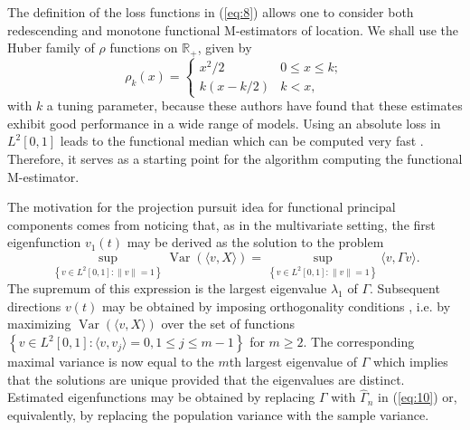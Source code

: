 \documentclass[11pt]{article}
\DeclareMathOperator{\Var}{Var}
\begin{document}
The definition of the loss functions in (\ref{eq:8}) allows one to consider both redescending and monotone functional M-estimators of location. We shall use the Huber family of $\rho$ functions on $\mathbb{R}_{+}$, given by
\begin{equation}
\rho_{k}(x) = \begin{cases} x^2/2 & 0\leq x \leq k; \\ 
k\left(x-k/2 \right)&  k < x, \end{cases}
\end{equation}
with $k$ a tuning parameter, because these authors have found that these estimates exhibit good performance in a wide range of models. Using an absolute loss in $L^2[0,1]$ leads to the functional median which can be computed very fast \citep{gervini2008robust}. Therefore, it serves as a starting point for the algorithm computing the functional M-estimator. 
 
The motivation for the projection pursuit idea for functional principal components comes from noticing that, as in the multivariate setting, the first eigenfunction $v_1(t)$ may be derived as the solution to the problem
\begin{equation}
\label{eq:10}
\sup_{\left\{ v \in L^2[0,1]: \left\|v \right\| = 1 \right\}} \Var\left( \langle v, X \rangle \right) = \sup_{\left\{v \in L^2[0,1]: \left\|v \right\| = 1 \right\}} \langle v, \Gamma v \rangle.
\end{equation}
The supremum of this expression is the largest eigenvalue $\lambda_1$ of $\Gamma$. Subsequent directions $v(t)$ may be obtained by imposing orthogonality conditions , i.e. by maximizing $\Var (\langle v, X \rangle)$ over the set of functions $\left\{ v \in L^2 [0,1]: \langle v, v_j \rangle = 0, 1\leq j \leq m-1 \right\}$ for $m \geq 2$. The corresponding maximal variance is now equal to the $m$th largest eigenvalue of $\Gamma$ which implies that the solutions are unique provided that the eigenvalues are distinct. Estimated eigenfunctions may be obtained by replacing $\Gamma$ with $\widehat{\Gamma}_n$ in (\ref{eq:10})  or, equivalently, by replacing the population variance with the sample variance.
\end{document}
